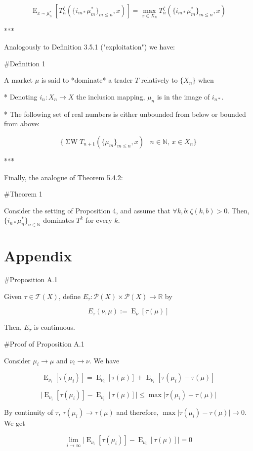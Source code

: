 \documentclass[a4paper]{article}
\DeclareMathOperator{\E}{E}
\newcommand{\Nats}{\mathbb{N}}
\newcommand{\Reals}{\mathbb{R}}
\newcommand{\Abs}[1]{\lvert #1 \rvert}
\newcommand{\Prob}{\mathcal{P}}
\newcommand{\T}{\mathcal{T}(X)}
\newcommand{\SW}{\operatorname{\Sigma W}}
\begin{document}
$$\E_{x \sim \mu^*_n}[T^\zeta_n(\{i_{m*}\mu^*_m\}_{m \leq n},x)] = \max_{x \in X_n} T^\zeta_n(\{i_{m*}\mu^*_m\}_{m \leq n},x)$$

***

Analogously to Definition 3.5.1 ("exploitation") we have:

\#Definition 1

A market ${\mu}$ is said to *dominate* a trader ${T}$ relatively to ${\{X_n\}}$ when

* Denoting ${i_n: X_n \rightarrow X}$ the inclusion mapping, ${\mu_n}$ is in the image of ${i_{n*}}$.

* The following set of real numbers is either unbounded from below or bounded from above:

$$\{\SW T_{n+1}(\{\mu_m\}_{m \leq n},x) \mid n \in \Nats,\, x \in X_n\}$$

***

Finally, the analogue of Theorem 5.4.2:

\#Theorem 1

Consider the setting of Proposition 4, and assume that ${\forall k,b: \zeta(k,b) > 0}$.  Then, ${\{i_{n*}\mu^*_n\}_{n \in \Nats}}$ dominates ${T^k}$ for every ${k}$.

\section{Appendix}

\#Proposition A.1

Given ${\tau \in \T}$, define ${E_\tau: \Prob(X) \times \Prob(X) \rightarrow \Reals}$ by

$$E_\tau(\nu,\mu):=\E_\nu[\tau(\mu)]$$

Then, ${E_\tau}$ is continuous.

\#Proof of Proposition A.1

Consider ${\mu_i \rightarrow \mu}$ and ${\nu_i \rightarrow \nu}$. We have

$$\E_{\nu_i}[\tau(\mu_i)] = \E_{\nu_i}[\tau(\mu)] + \E_{\nu_i}[\tau(\mu_i) - \tau(\mu)]$$

$$\Abs{\E_{\nu_i}[\tau(\mu_i)] - \E_{\nu_i}[\tau(\mu)]} \leq \max\Abs{\tau(\mu_i) - \tau(\mu)}$$

By continuity of ${\tau}$, ${\tau(\mu_i) \rightarrow \tau(\mu)}$ and therefore, $\max\Abs{\tau(\mu_i) - \tau(\mu)} \rightarrow 0$. We get

$$\lim_{i \rightarrow \infty} \Abs{\E_{\nu_i}[\tau(\mu_i)] - \E_{\nu_i}[\tau(\mu)]} = 0$$
\end{document}
